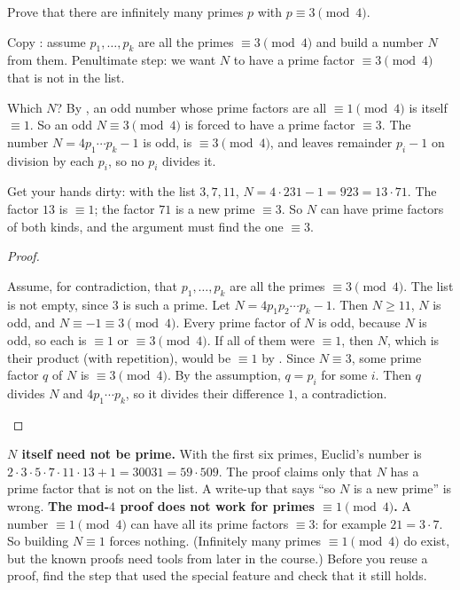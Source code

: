 \documentclass[10pt]{scrartcl}
\begin{document}
\begin{example*}
  Prove that there are infinitely many primes $p$ with $p \equiv 3 \pmod 4$.
\end{example*}

Copy : assume $p_1, \dots, p_k$ are all the primes $\equiv 3 \pmod 4$ and build a number $N$ from them. Penultimate step: we want $N$ to have a prime factor $\equiv 3 \pmod 4$ that is not in the list.

\begin{ideabox}
  Which $N$? By , an odd number whose prime factors are all $\equiv 1 \pmod 4$ is itself $\equiv 1$. So an odd $N \equiv 3 \pmod 4$ is forced to have a prime factor $\equiv 3$. The number $N = 4p_1 \cdots p_k - 1$ is odd, is $\equiv 3 \pmod 4$, and leaves remainder $p_i - 1$ on division by each $p_i$, so no $p_i$ divides it.
\end{ideabox}

Get your hands dirty: with the list $3, 7, 11$, $N = 4 \cdot 231 - 1 = 923 = 13 \cdot 71$. The factor $13$ is $\equiv 1$; the factor $71$ is a new prime $\equiv 3$. So $N$ can have prime factors of both kinds, and the argument must find the one $\equiv 3$.

\begin{proof}
  \begin{steps}
    \ii Assume, for contradiction, that $p_1, \dots, p_k$ are all the primes $\equiv 3 \pmod 4$. The list is not empty, since $3$ is such a prime.
    \ii Let $N = 4p_1 p_2 \cdots p_k - 1$. Then $N \geq 11$, $N$ is odd, and $N \equiv -1 \equiv 3 \pmod 4$.
    \ii Every prime factor of $N$ is odd, because $N$ is odd, so each is $\equiv 1$ or $\equiv 3 \pmod 4$. If all of them were $\equiv 1$, then $N$, which is their product (with repetition), would be $\equiv 1$ by . Since $N \equiv 3$, some prime factor $q$ of $N$ is $\equiv 3 \pmod 4$.
    \ii By the assumption, $q = p_i$ for some $i$. Then $q$ divides $N$ and $4p_1 \cdots p_k$, so it divides their difference $1$, a contradiction.
  \end{steps}
\end{proof}

\begin{trapbox}
  \ii \textbf{$N$ itself need not be prime.} With the first six primes, Euclid's number is $2\cdot3\cdot5\cdot7\cdot11\cdot13 + 1 = 30031 = 59 \cdot 509$. The proof claims only that $N$ has a prime factor that is not on the list. A write-up that says ``so $N$ is a new prime'' is wrong.
  \ii \textbf{The mod-$4$ proof does not work for primes $\equiv 1 \pmod 4$.} A number $\equiv 1 \pmod 4$ can have all its prime factors $\equiv 3$: for example $21 = 3 \cdot 7$. So building $N \equiv 1$ forces nothing. (Infinitely many primes $\equiv 1 \pmod 4$ do exist, but the known proofs need tools from later in the course.) Before you reuse a proof, find the step that used the special feature and check that it still holds.
\end{trapbox}
\end{document}
